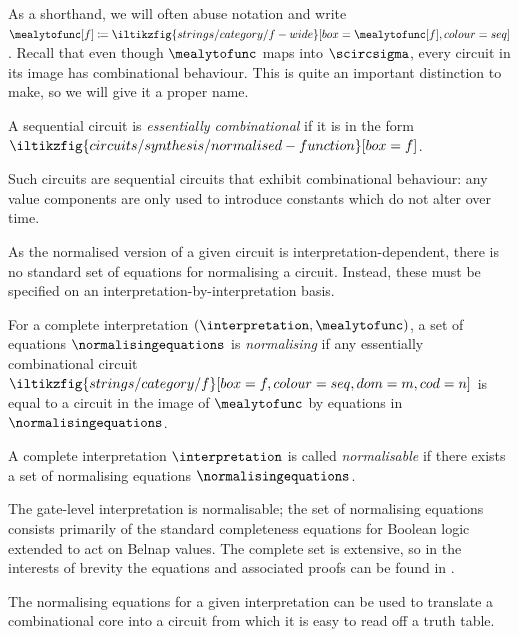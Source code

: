 \documentclass{lmcs}
\begin{document}
As a shorthand, we will often abuse notation and write \(
\mealytofunc[f]
\coloneqq
\iltikzfig{strings/category/f-wide}[box=\mealytofunc[f],colour=seq]
\).
Recall that even though \(\mealytofunc\) maps into \(\scircsigma\), every
circuit in its image has combinational behaviour.
This is quite an important distinction to make, so we will give it a proper
name.

\begin{defi}
    A sequential circuit is \emph{essentially combinational} if it is in the
    form \(
    \iltikzfig{circuits/synthesis/normalised-function}[box=f]
    \).
\end{defi}

Such circuits are sequential circuits that exhibit combinational behaviour: any
value components are only used to introduce constants which do not alter over
time.

As the normalised version of a given circuit is interpretation-dependent, there
is no standard set of equations for normalising a circuit.
Instead, these must be specified on an interpretation-by-interpretation basis.

\begin{defi}
    For a complete interpretation \((\interpretation,\mealytofunc)\), a set of
    equations \(\normalisingequations\) is \emph{normalising} if any
    essentially combinational circuit \(
    \iltikzfig{strings/category/f}[box=f,colour=seq,dom=m,cod=n]
    \) is equal to a circuit in the image of \(\mealytofunc\) by equations in
    \(\normalisingequations\).
\end{defi}

\begin{defi}
    A complete interpretation \(\interpretation\) is called \emph{normalisable} if there
    exists a set of normalising equations \(\normalisingequations\).
\end{defi}

\begin{exa}
    The gate-level interpretation is normalisable; the set of normalising
    equations consists primarily of the standard completeness equations for
    Boolean logic extended to act on Belnap values.
    The complete set is extensive, so in the interests of brevity the equations
    and associated proofs can be found in \cite[Sec.\ 6.5]{kaye2024foundations}.
\end{exa}

The normalising equations for a given interpretation can be used to translate a
combinational core into a circuit from which it is easy to read off a truth
table.
\end{document}

